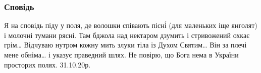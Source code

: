  
 
 

\subsubsection{Сповідь}

Я на сповідь піду у поля,
де волошки співають пісні́
(для маленьких іще янголят)
і молочні тумани рясні.
Там бджола над нектаром дзумить
і стривожений охкає грім…
Відчуваю нутром кожну мить
злуки тіла із Духом Святим…
Він за плечі мене обніма…
і указує праведний шлях.
Не повірю, що Бога нема
в України просторих полях.
31.10.20р.
